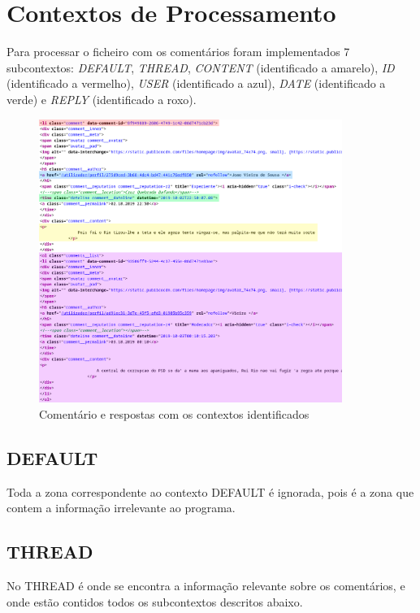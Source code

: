 \documentclass[a4paper]{report}
\begin{document}
\section{Contextos de Processamento}

Para processar o ficheiro com os comentários foram implementados 7 subcontextos:
\textit{DEFAULT}, \textit{THREAD}, \textit{CONTENT} (identificado a amarelo),
\textit{ID} (identificado a vermelho), \textit{USER} (identificado a azul),
\textit{DATE} (identificado a verde) e \textit{REPLY} (identificado a roxo).

\begin{figure}[H]
    \centering
    \includegraphics[width=0.88\textwidth]{states.png}
    \caption{Comentário e respostas com os contextos identificados}
\end{figure}

\subsection{DEFAULT}

Toda a zona correspondente ao contexto DEFAULT é ignorada, pois é a zona
que contem a informação irrelevante ao programa.

\subsection{THREAD}

No THREAD é onde se encontra a informação relevante sobre os comentários,
e onde estão contidos todos os subcontextos descritos abaixo.
\end{document}
